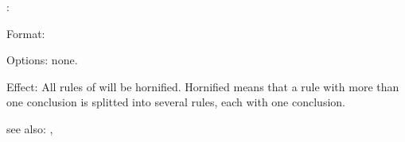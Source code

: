 :

Format: 

Options: none.

Effect:	All rules of  will be hornified. Hornified means that a 
	rule with more than one conclusion is splitted into several rules, each
	with one conclusion.
	
see also: , 
